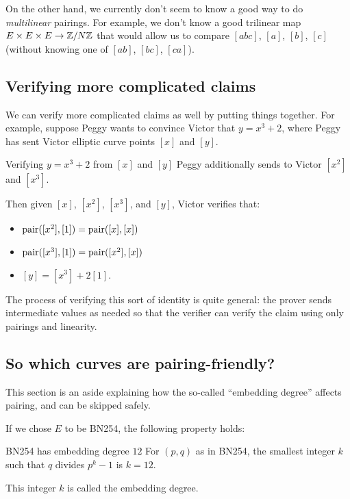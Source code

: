 \begin{remark}{}{}
On the other hand, we currently don't seem to know a good
way to do \emph{multilinear} pairings.
For example, we don't know a good trilinear map
$E \times E \times E \rightarrow \mathbb{Z} / N \mathbb{Z}$
that would allow us to compare $[a b c]$, $[a]$, $[b]$, $[c]$
(without knowing one of $[a b]$, $[b c]$, $[c a]$).
\end{remark}

\subsection{Verifying more complicated claims}\label{pair-verify}
We can verify more complicated claims as well by putting things together.
For example, suppose Peggy wants to convince Victor that $y = x^{3} + 2$, where
Peggy has sent Victor elliptic curve points $[x]$ and $[y]$.

\begin{example}{}{Verifying $y = x^3+2$ from $[x]$ and $[y]$}
Peggy additionally sends to Victor $[x^2]$ and $[x^3]$.

Then given $[x]$, $[x^2]$, $[x^3]$, and $[y]$, Victor verifies that:
\begin{itemize}
\item $\operatorname{pair}([x^{2}],[1]) = \operatorname{pair}([x],[x])$
\item $\operatorname{pair}([x^{3}],[1]) = \operatorname{pair}([x^2],[x])$
\item $[y] = [x^3] + 2[1]$.
\end{itemize}
\end{example}

The process of verifying this sort of identity is quite general: the
prover sends intermediate values as needed so that the verifier can
verify the claim using only pairings and linearity.

\subsection{So which curves are pairing-friendly?}\label{pairing-friendly}
This section is an aside explaining how the so-called
``embedding degree'' affects pairing, and can be skipped safely.

If we chose $E$ to be BN254, the following property holds:
\begin{proposition}{BN254 has embedding degree $12$}{}
For $(p,q)$ as in BN254, the smallest integer $k$ such that $q$
divides $p^{k} - 1$ is $k = 12$.
\end{proposition}
This integer $k$ is called the \alert{embedding degree}.

